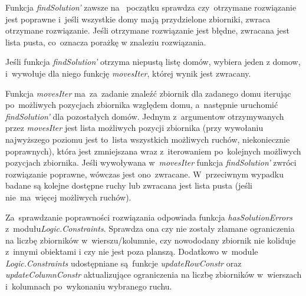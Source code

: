 \documentclass[11pt,a4paper]{article}
\begin{document}
Funkcja \textit{findSolution'} zawsze na~ początku sprawdza czy~otrzymane
rozwiązanie jest poprawne i~jeśli wszystkie domy mają przydzielone zbiorniki,
zwraca otrzymane rozwiązanie. Jeśli otrzymane rozwiązanie jest błędne, zwracana
jest lista pusta, co~oznacza porażkę w znaleziu rozwiązania.

Jeśli funkcja \textit{findSolution'} otrzyma niepustą listę domów, wybiera
jeden z domow, i~wywołuje dla niego funkcję \textit{movesIter}, której
wynik jest zwracany.

Funkcja \textit{movesIter} ma~za~zadanie znaleźć zbiornik dla zadanego domu
iterując po~możliwych pozycjach zbiornika względem domu,
a~następnie uruchomić \textit{findSolution'} dla pozostałych domów.
Jednym z~argumentow otrzymywanych przez \textit{movesIter} jest lista możliwych
pozycji zbiornika (przy wywołaniu najwyższego poziomu jest to~lista wszystkich
możliwych ruchów, niekoniecznie poprawnych), która jest zmniejszana wraz
z~iterowaniem po~kolejnych możliwych pozycjach zbiornika. Jeśli wywoływana
w~\textit{movesIter} funkcja \textit{findSolution'} zwróci rozwiązanie poprawne,
wówczas jest ono~zwracane. W~przeciwnym wypadku badane są kolejne dostępne
ruchy lub zwracana jest lista pusta (jeśli nie~ma~więcej możliwych ruchów).

Za~sprawdzanie poprawności rozwiązania odpowiada funkcja
\textit{hasSolutionErrors} z~modułu\newline \textit{Logic.Constraints}.
Sprawdza ona czy nie zostały złamane ograniczenia na liczbę zbiorników
w~wierszu/kolumnie, czy nowododany zbiornik nie koliduje z~innymi
obiektami i czy nie jest poza planszą. Dodatkowo w~module
\textit{Logic.Constraints} udostępniane są~funkcje \textit{updateRowConstr} oraz \textit{updateColumnConstr}
aktualizujące ograniczenia na liczbę zbiorników w~wierszach i~kolumnach
po~wykonaniu wybranego ruchu.
\end{document}
